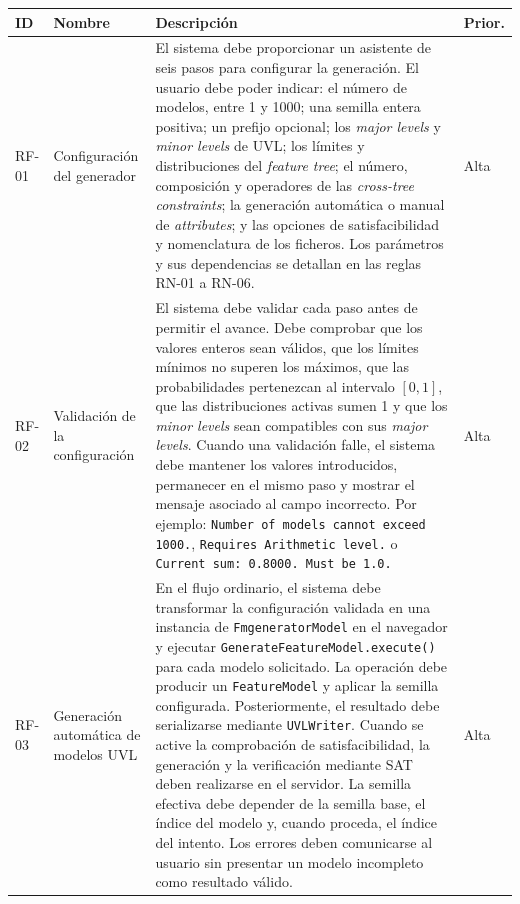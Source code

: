 \begin{longtable}{@{}P{1.25cm} P{3.2cm}
P{\dimexpr\textwidth-5.7cm-6\tabcolsep\relax} P{1.25cm}@{}}

\toprule
\textbf{ID} & \textbf{Nombre} & \textbf{Descripción} & \textbf{Prior.} \\
\midrule
\endhead

RF-01 &
Configuración del generador &
El sistema debe proporcionar un asistente de seis pasos para configurar
la generación. El usuario debe poder indicar: el número de modelos, entre 1 y
1000; una semilla entera positiva; un prefijo opcional; los \textit{major
levels} y \textit{minor levels} de UVL; los límites y distribuciones del
\textit{feature tree}; el número, composición y operadores de las
\textit{cross-tree constraints}; la generación automática o manual de
\textit{attributes}; y las opciones de satisfacibilidad y nomenclatura de los
ficheros. Los parámetros y sus dependencias se detallan en las
reglas RN-01 a RN-06.
&
Alta \\[0.8em]

RF-02 &
Validación de la configuración &
El sistema debe validar cada paso antes de permitir el avance. Debe comprobar
que los valores enteros sean válidos, que los límites mínimos no superen los
máximos, que las probabilidades pertenezcan al intervalo $[0,1]$, que las
distribuciones activas sumen 1 y que los \textit{minor levels} sean compatibles
con sus \textit{major levels}. Cuando una validación falle, el sistema debe
mantener los valores introducidos, permanecer en el mismo paso y mostrar el
mensaje asociado al campo incorrecto. Por ejemplo:
\texttt{Number of models cannot exceed 1000.},
\texttt{Requires Arithmetic level.} o
\texttt{Current sum: 0.8000. Must be 1.0.}
&
Alta \\[0.8em]

RF-03 &
Generación automática de modelos UVL &
En el flujo ordinario, el sistema debe transformar la configuración
validada en una instancia de \texttt{FmgeneratorModel} en el navegador
y ejecutar \texttt{GenerateFeatureModel.execute()} para cada modelo
solicitado. La operación debe producir un \texttt{FeatureModel} y aplicar la semilla
configurada. Posteriormente, el resultado debe serializarse mediante
\texttt{UVLWriter}. Cuando se active la comprobación de
satisfacibilidad, la generación y la verificación mediante SAT deben
realizarse en el servidor. La semilla efectiva debe depender de la
semilla base, el índice del modelo y, cuando proceda, el índice del
intento. Los errores deben comunicarse al usuario sin presentar un
modelo incompleto como resultado válido.
&
Alta \\[0.8em]


\end{longtable}
